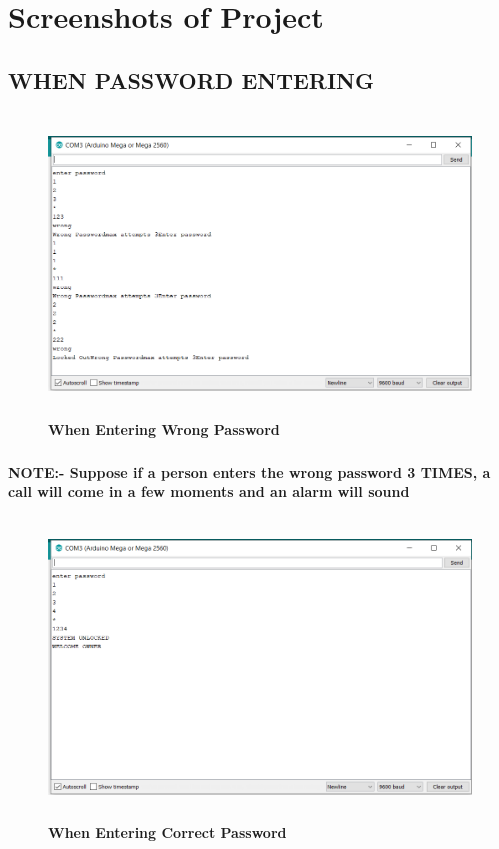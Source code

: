 \chapter{Screenshots of Project}
\section{WHEN PASSWORD ENTERING}
\vspace{2cm}
\begin{figure}[H]
  \centering
    \includegraphics[height= 8cm, width=12cm]{project/images/WrongPassword}
    \caption{\textbf { When Entering Wrong Password}}
\end{figure}
\paragraph{}\textbf{ \color{red} NOTE:- Suppose if a person enters the wrong password 3 TIMES, a call will come in a few moments and an alarm will sound}
\newpage
\begin{figure}[H]
  \centering
    \includegraphics[height= 8cm, width=12cm]{project/images/currectPassword}
     \caption{\textbf { When Entering Correct Password}}
     
\end{figure}
